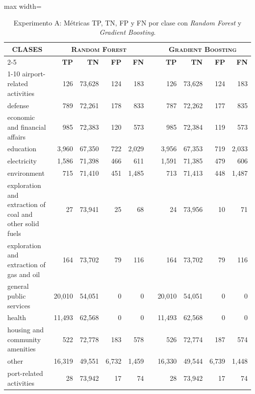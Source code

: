 \documentclass[a4paper,fleqn]{cas-sc}
\begin{document}
\begin{table}[t]
	\centering
	\scriptsize
	\renewcommand{\arraystretch}{1.3} %
	\setlength{\tabcolsep}{7pt}
\caption{Experimento A: Métricas TP, TN, FP y FN por clase con \textit{Random Forest} y \textit{Gradient Boosting}.}	
	\label{tab:experimento-a-matriz-confusion}	
	\begin{adjustbox}{max width=\textwidth}	
		\begin{tabular}{p{4cm}rrrrcrrrr} 			
			\hline
			\multicolumn{1}{c}{\multirow{2}{*}{\textbf{\textsc{CLASES}}}} & \multicolumn{4}{c}{\textbf{\textsc{Random Forest}}} & \multirow{2}{*}{} & \multicolumn{4}{c}{\textbf{\textsc{Gradient Boosting}}} \\ \cline{2-5} \cline{7-10}
			{} & \textbf{\textsc{TP}} & \textbf{\textsc{TN}} & \textbf{\textsc{FP}} & \textbf{\textsc{FN}} & & \textbf{\textsc{TP}} & \textbf{\textsc{TN}} & \textbf{\textsc{FP}} & \textbf{\textsc{FN}} \\ \cline{1-10} %
			airport-related activities & 126 & 73,628 & 124 & 183 & & 126 & 73,628 & 124 & 183 \\ 
			defense & 789 & 72,261 & 178 & 833 & & 787 & 72,262 & 177 & 835 \\ 
			economic and financial affairs & 985 & 72,383 & 120 & 573 & & 985 & 72,384 & 119 & 573 \\ 
			education & 3,960 & 67,350 & 722 & 2,029 & & 3,956 & 67,353 & 719 & 2,033 \\ 
			electricity & 1,586 & 71,398 & 466 & 611 & & 1,591 & 71,385 & 479 & 606 \\ 
			environment & 715 & 71,410 & 451 & 1,485 & & 713 & 71,413 & 448 & 1,487 \\ 
			exploration and extraction of coal and other solid fuels & 27 & 73,941 & 25 & 68 & & 24 & 73,956 & 10 & 71 \\ 
			exploration and extraction of gas and oil & 164 & 73,702 & 79 & 116 & & 164 & 73,702 & 79 & 116 \\ 
			general public services & 20,010 & 54,051 & 0 & 0 & & 20,010 & 54,051 & 0 & 0 \\ 
			health & 11,493 & 62,568 & 0 & 0 & & 11,493 & 62,568 & 0 & 0 \\ 
			housing and community amenities & 522 & 72,778 & 183 & 578 & & 526 & 72,774 & 187 & 574 \\ 
			other & 16,319 & 49,551 & 6,732 & 1,459 & & 16,330 & 49,544 & 6,739 & 1,448 \\ 
			port-related activities & 28 & 73,942 & 17 & 74 & & 28 & 73,942 & 17 & 74 \\ 

\end{tabular}
\end{adjustbox}
\end{table}
\end{document}
